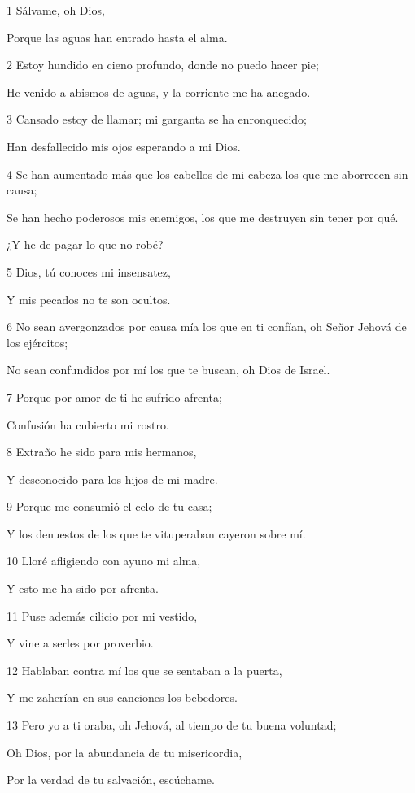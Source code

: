 \par 1 Sálvame, oh Dios,
\par Porque las aguas han entrado hasta el alma.
\par 2 Estoy hundido en cieno profundo, donde no puedo hacer pie;
\par He venido a abismos de aguas, y la corriente me ha anegado.
\par 3 Cansado estoy de llamar; mi garganta se ha enronquecido;
\par Han desfallecido mis ojos esperando a mi Dios.
\par 4 Se han aumentado más que los cabellos de mi cabeza los que me aborrecen sin causa;
\par Se han hecho poderosos mis enemigos, los que me destruyen sin tener por qué.
\par ¿Y he de pagar lo que no robé?
\par 5 Dios, tú conoces mi insensatez,
\par Y mis pecados no te son ocultos.
\par 6 No sean avergonzados por causa mía los que en ti confían, oh Señor Jehová de los ejércitos;
\par No sean confundidos por mí los que te buscan, oh Dios de Israel.
\par 7 Porque por amor de ti he sufrido afrenta;
\par Confusión ha cubierto mi rostro.
\par 8 Extraño he sido para mis hermanos,
\par Y desconocido para los hijos de mi madre.
\par 9 Porque me consumió el celo de tu casa;
\par Y los denuestos de los que te vituperaban cayeron sobre mí.
\par 10 Lloré afligiendo con ayuno mi alma,
\par Y esto me ha sido por afrenta.
\par 11 Puse además cilicio por mi vestido,
\par Y vine a serles por proverbio.
\par 12 Hablaban contra mí los que se sentaban a la puerta,
\par Y me zaherían en sus canciones los bebedores.
\par 13 Pero yo a ti oraba, oh Jehová, al tiempo de tu buena voluntad;
\par Oh Dios, por la abundancia de tu misericordia,
\par Por la verdad de tu salvación, escúchame.
